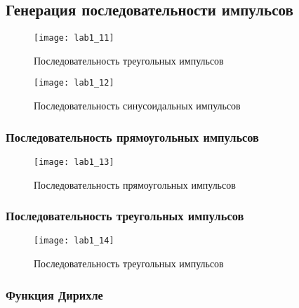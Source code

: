 \subsection{Генерация последовательности импульсов}

\begin{figure}[H]
	\begin{center}
		\texttt{[image: lab1\_11]}
		\caption{Последовательность треугольных импульсов} 
		\label{pic:lab1_11} %
	\end{center}
\end{figure}

\begin{figure}[H]
	\begin{center}
		\texttt{[image: lab1\_12]}
		\caption{Последовательность синусоидальных импульсов} 
		\label{pic:lab1_12} %
	\end{center}
\end{figure}


\subsubsection{Последовательность прямоугольных импульсов}
\begin{figure}[H]
	\begin{center}
		\texttt{[image: lab1\_13]}
		\caption{Последовательность прямоугольных импульсов} 
		\label{pic:lab1_13} %
	\end{center}
\end{figure}
\subsubsection{Последовательность треугольных импульсов}
\begin{figure}[H]
	\begin{center}
		\texttt{[image: lab1\_14]}
		\caption{Последовательность треугольных импульсов} 
		\label{pic:lab1_14} %
	\end{center}
\end{figure}

\subsubsection{Функция Дирихле}

